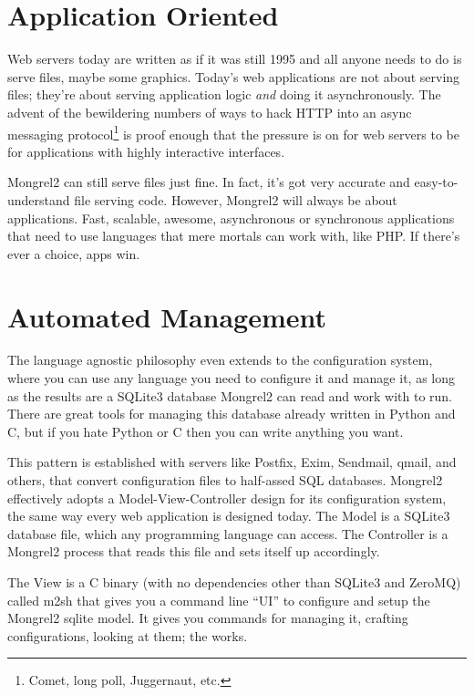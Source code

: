 \section{Application Oriented}

Web servers today are written as if it was still 1995 and all anyone needs to do
is serve files, maybe some graphics.  Today's web applications are not about serving
files; they're about serving application logic \emph{and} doing it asynchronously.
The advent of the bewildering numbers of ways to hack HTTP into an async messaging
protocol\footnote{Comet, long poll, Juggernaut, etc.} is proof enough that the
pressure is on for web servers to be for applications with highly interactive
interfaces.

Mongrel2 can still serve files just fine.  In fact, it's got very accurate and
easy-to-understand file serving code.  However, Mongrel2 will always be about applications.
Fast, scalable, awesome, asynchronous or synchronous applications that need to use languages
that mere mortals can work with, like PHP\@. If there's ever a choice, apps win.

\section{Automated Management}

The language agnostic philosophy even extends to the configuration system, where
you can use any language you need to configure it and manage it, as long as the
results are a SQLite3 database Mongrel2 can read and work with to run.  There
are great tools for managing this database already written in Python and C, but
if you hate Python or C then you can write anything you want.

This pattern is established with servers like Postfix, Exim, Sendmail, qmail,
and others, that convert configuration files to half-assed SQL databases.
Mongrel2 effectively adopts a Model-View-Controller design for its
configuration system, the same way every web application is designed today.
The Model is a SQLite3 database file, which any programming language can access.
The Controller is a Mongrel2 process that reads this file and sets itself up
accordingly.

The View is a C binary (with no dependencies other than SQLite3 and ZeroMQ)
called m2sh that gives you a command line ``UI'' to configure and setup the
Mongrel2 sqlite model.  It gives you commands for managing it, crafting
configurations, looking at them; the works.

